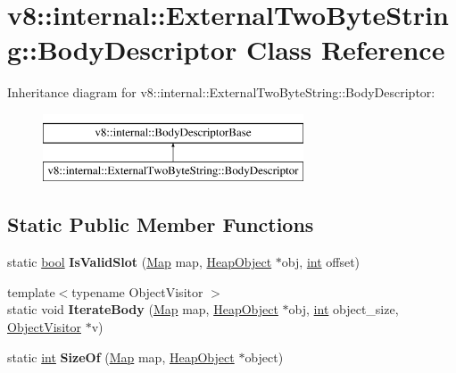 \hypertarget{classv8_1_1internal_1_1ExternalTwoByteString_1_1BodyDescriptor}{}\section{v8\+:\+:internal\+:\+:External\+Two\+Byte\+String\+:\+:Body\+Descriptor Class Reference}
\label{classv8_1_1internal_1_1ExternalTwoByteString_1_1BodyDescriptor}
Inheritance diagram for v8\+:\+:internal\+:\+:External\+Two\+Byte\+String\+:\+:Body\+Descriptor\+:\begin{figure}[H]
\begin{center}
\leavevmode
\includegraphics[height=2.000000cm]{classv8_1_1internal_1_1ExternalTwoByteString_1_1BodyDescriptor}
\end{center}
\end{figure}
\subsection*{Static Public Member Functions}
\begin{DoxyCompactItemize}
\item 
\mbox{\label{classv8_1_1internal_1_1ExternalTwoByteString_1_1BodyDescriptor_a3a3aed377c90d24261067cc50bcb639c}} 
static \mbox{\hyperlink{classbool}{bool}} {\bfseries Is\+Valid\+Slot} (\mbox{\hyperlink{classv8_1_1internal_1_1Map}{Map}} map, \mbox{\hyperlink{classv8_1_1internal_1_1HeapObject}{Heap\+Object}} $\ast$obj, \mbox{\hyperlink{classint}{int}} offset)
\item 
\mbox{\label{classv8_1_1internal_1_1ExternalTwoByteString_1_1BodyDescriptor_aa2a21d60bc28a9682a81d098b39793f5}} 
{\footnotesize template$<$typename Object\+Visitor $>$ }\\static void {\bfseries Iterate\+Body} (\mbox{\hyperlink{classv8_1_1internal_1_1Map}{Map}} map, \mbox{\hyperlink{classv8_1_1internal_1_1HeapObject}{Heap\+Object}} $\ast$obj, \mbox{\hyperlink{classint}{int}} object\+\_\+size, \mbox{\hyperlink{classv8_1_1internal_1_1ObjectVisitor}{Object\+Visitor}} $\ast$v)
\item 
\mbox{\label{classv8_1_1internal_1_1ExternalTwoByteString_1_1BodyDescriptor_af2830003f3fba21057d795f469cfa722}} 
static \mbox{\hyperlink{classint}{int}} {\bfseries Size\+Of} (\mbox{\hyperlink{classv8_1_1internal_1_1Map}{Map}} map, \mbox{\hyperlink{classv8_1_1internal_1_1HeapObject}{Heap\+Object}} $\ast$object)
\end{DoxyCompactItemize}
